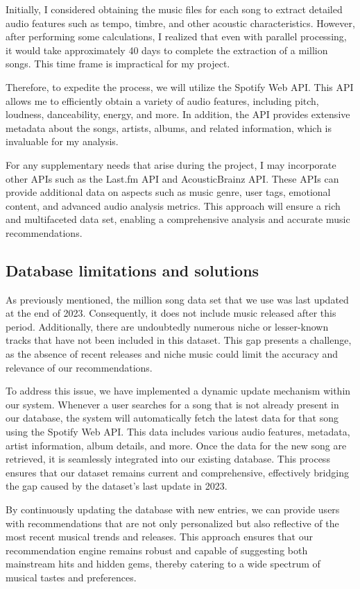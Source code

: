 \documentclass[9pt,twocolumn,twoside,lineno]{gsajnl}
\begin{document}
Initially, I considered obtaining the music files for each song to extract detailed audio features such as tempo, timbre, and other acoustic characteristics. However, after performing some calculations, I realized that even with parallel processing, it would take approximately 40 days to complete the extraction of a million songs. This time frame is impractical for my project.

Therefore, to expedite the process, we will utilize the Spotify Web API. This API allows me to efficiently obtain a variety of audio features, including pitch, loudness, danceability, energy, and more. In addition, the API provides extensive metadata about the songs, artists, albums, and related information, which is invaluable for my analysis.

For any supplementary needs that arise during the project, I may incorporate other APIs such as the Last.fm API and AcousticBrainz API. These APIs can provide additional data on aspects such as music genre, user tags, emotional content, and advanced audio analysis metrics. This approach will ensure a rich and multifaceted data set, enabling a comprehensive analysis and accurate music recommendations.

\subsection{Database limitations and solutions}
As previously mentioned, the million song data set that we use was last updated at the end of 2023. Consequently, it does not include music released after this period. Additionally, there are undoubtedly numerous niche or lesser-known tracks that have not been included in this dataset. This gap presents a challenge, as the absence of recent releases and niche music could limit the accuracy and relevance of our recommendations.

To address this issue, we have implemented a dynamic update mechanism within our system. Whenever a user searches for a song that is not already present in our database, the system will automatically fetch the latest data for that song using the Spotify Web API. This data includes various audio features, metadata, artist information, album details, and more. Once the data for the new song are retrieved, it is seamlessly integrated into our existing database. This process ensures that our dataset remains current and comprehensive, effectively bridging the gap caused by the dataset’s last update in 2023.

By continuously updating the database with new entries, we can provide users with recommendations that are not only personalized but also reflective of the most recent musical trends and releases. This approach ensures that our recommendation engine remains robust and capable of suggesting both mainstream hits and hidden gems, thereby catering to a wide spectrum of musical tastes and preferences.
\end{document}
